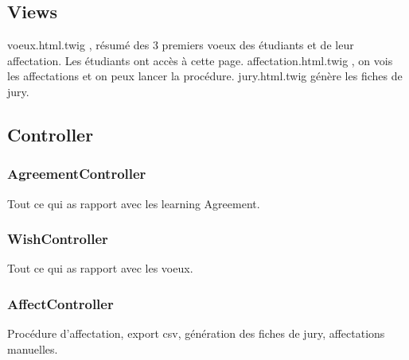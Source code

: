 \subsection{Views}
voeux.html.twig , résumé des 3 premiers voeux des étudiants et de leur affectation. Les étudiants ont accès à cette page.
affectation.html.twig , on vois les affectations et on peux lancer la procédure.
jury.html.twig génère les fiches de jury.

\subsection{Controller}
\subsubsection{AgreementController}
Tout ce qui as rapport avec les learning Agreement.

\subsubsection{WishController}
Tout ce qui as rapport avec les voeux.

\subsubsection{AffectController}
Procédure d'affectation, export csv, génération des fiches de jury, affectations manuelles.